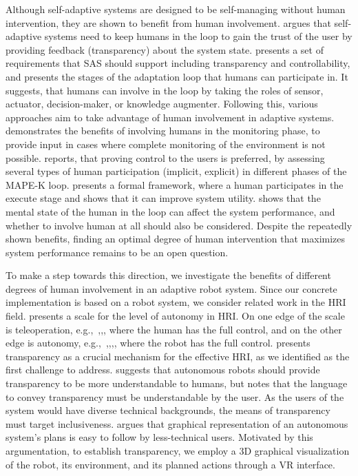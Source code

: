 \documentclass[10pt, conference]{IEEEtran}
\begin{document}
Although self-adaptive systems are designed to be self-managing without human intervention, they are shown to benefit from human involvement. \cite{brun2009engineering} argues that self-adaptive systems need to keep humans in the loop to gain the trust of the user by providing feedback (transparency) about the system state. \cite{seams16_designing_human_itl} presents a set of requirements that SAS should support including transparency and controllability, and presents the stages of the adaptation loop that humans can participate in. It suggests, that humans can involve in the loop by taking the roles of sensor, actuator, decision-maker, or knowledge augmenter. Following this, various approaches aim to take advantage of human involvement in adaptive systems. \cite{whittle_role_2010} demonstrates the benefits of involving humans in the monitoring phase, to provide input in cases where complete monitoring of the environment is not possible. \cite{evers_user_2014} reports, that proving control to the users is preferred, by assessing several types of human participation (implicit, explicit) in different phases of the MAPE-K loop. \cite{seams15_human_participation} presents a formal framework, where a human participates in the execute stage and shows that it can improve system utility. \cite{seams17_improving_hitl_brain} shows that the mental state of the human in the loop can affect the system performance, and whether to involve human at all should also be considered. Despite the repeatedly shown benefits, finding an optimal degree of human intervention that maximizes system performance remains to be an open question. 

To make a step towards this direction, we investigate the benefits of different degrees of human involvement in an adaptive robot system.
Since our concrete implementation is based on a robot system, we consider related work in the HRI field. \cite{hri_survey} presents a scale for the level of autonomy in HRI. On one edge of the scale is teleoperation, e.g.,~\cite{robot_teleop_vr_2002},\cite{robot_teleop_space_2004},\cite{robot_teleop_surgery_2004}, where the human has the full control, and on the other edge is autonomy, e.g.,~\cite{robot_autonom_1995},\cite{robot_autonom_2010},\cite{robot_autonom_2011},\cite{robot_autonom_2019}, where the robot has the full control. \cite{lyons2013being} presents transparency as a crucial mechanism for the effective HRI, as we identified as the first challenge to address. \cite{kim_who_2006} suggests that autonomous robots should provide transparency to be more understandable to humans, but notes that the language to convey transparency must be understandable by the user. As the users of the system would have diverse technical backgrounds, the means of transparency must target inclusiveness. \cite{theodorou_designing_2017} argues that graphical representation of an autonomous system's plans is easy to follow by less-technical users. Motivated by this argumentation, to establish transparency, we employ a 3D graphical visualization of the robot, its environment, and its planned actions through a VR interface. 
\end{document}
